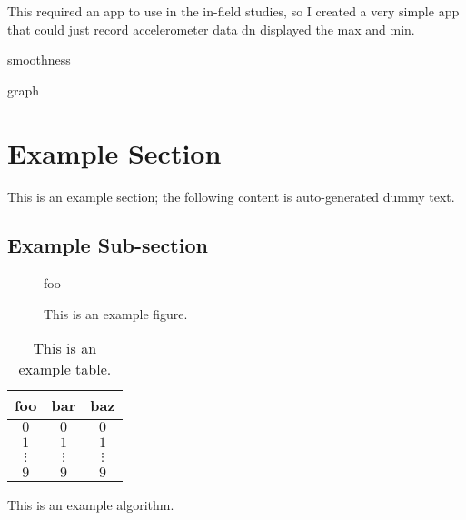 This required an app to use in the in-field studies, so I created a very simple app that could just record accelerometer data dn displayed the max and min.


smoothness

graph





























\section{Example Section}

This is an example section;
the following content is auto-generated dummy text.
\lipsum

\subsection{Example Sub-section}

\begin{figure}[t]
\centering
foo
\caption{This is an example figure.}
\label{fig}
\end{figure}

\begin{table}[t]
\centering
\begin{tabular}{|cc|c|}
\hline
foo      & bar      & baz      \\
\hline
$0     $ & $0     $ & $0     $ \\
$1     $ & $1     $ & $1     $ \\
$\vdots$ & $\vdots$ & $\vdots$ \\
$9     $ & $9     $ & $9     $ \\
\hline
\end{tabular}
\caption{This is an example table.}
\label{tab}
\end{table}

\begin{algorithm}[t]
\caption{This is an example algorithm.}
\label{alg}
\end{algorithm}

